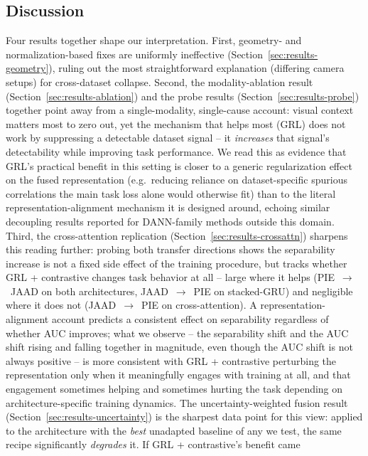 \subsection{Discussion}
\label{sec:results-discussion}

Four results together shape our interpretation. First, geometry- and
normalization-based fixes are uniformly ineffective
(Section~\ref{sec:results-geometry}), ruling out the most
straightforward explanation (differing camera setups) for
cross-dataset collapse. Second, the modality-ablation result
(Section~\ref{sec:results-ablation}) and the probe results
(Section~\ref{sec:results-probe}) together point away from a
single-modality, single-cause account: visual context matters most to
zero out, yet the mechanism that helps most (GRL) does not work by
suppressing a detectable dataset signal -- it \emph{increases} that
signal's detectability while improving task performance. We read this
as evidence that GRL's practical benefit in this setting is closer to
a generic regularization effect on the fused representation (e.g.\
reducing reliance on dataset-specific spurious correlations the main
task loss alone would otherwise fit) than to the literal
representation-alignment mechanism it is designed around, echoing
similar decoupling results reported for DANN-family methods outside
this domain. Third, the cross-attention replication
(Section~\ref{sec:results-crossattn}) sharpens this reading further:
probing both transfer directions shows the separability increase is
not a fixed side effect of the training procedure, but tracks whether
GRL + contrastive changes task behavior at all -- large where it helps
(PIE~$\to$~JAAD on both architectures, JAAD~$\to$~PIE on stacked-GRU)
and negligible where it does not (JAAD~$\to$~PIE on cross-attention). A
representation-alignment account predicts a consistent effect on
separability regardless of whether AUC improves; what we observe -- the
separability shift and the AUC shift rising and falling together in
magnitude, even though the AUC shift is not always positive -- is more
consistent with GRL + contrastive perturbing the representation only
when it meaningfully engages with training at all, and that engagement
sometimes helping and sometimes hurting the task depending on
architecture-specific training dynamics. The uncertainty-weighted
fusion result (Section~\ref{sec:results-uncertainty}) is the sharpest
data point for this view: applied to the architecture with the
\emph{best} unadapted baseline of any we test, the same recipe
significantly \emph{degrades} it. If GRL + contrastive's benefit came
